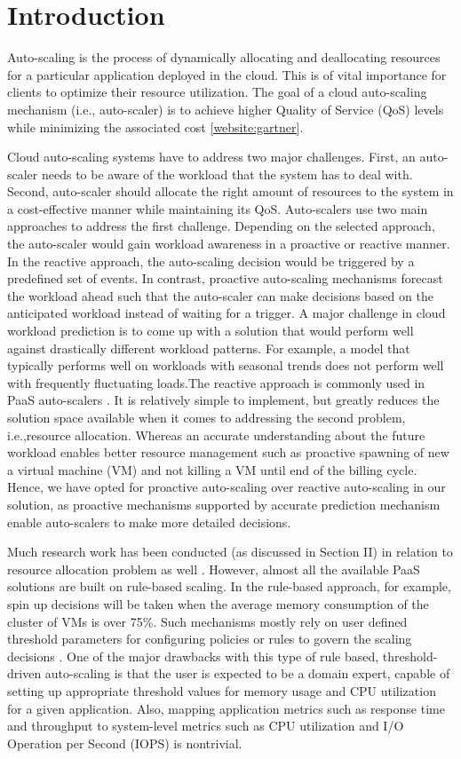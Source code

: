 \section{Introduction}
Auto-scaling is the process of dynamically allocating and deallocating resources for a particular application deployed in the cloud. This is of vital importance for clients to optimize their resource utilization. The goal of a cloud auto-scaling mechanism (i.e., auto-scaler) is to achieve higher Quality of Service (QoS) levels while minimizing the associated cost \ref{website:gartner}.

Cloud auto-scaling systems have to address two major challenges. First, an auto-scaler needs to be aware of the workload that the system has to deal with. Second, auto-scaler should allocate the right amount of resources to the system in a cost-effective manner while maintaining its QoS. Auto-scalers use two main approaches to address the first challenge. Depending on the selected approach, the auto-scaler would gain workload awareness in a proactive or reactive manner. In the reactive approach, the auto-scaling decision would be triggered by a predefined set of events. In contrast, proactive auto-scaling mechanisms forecast the workload ahead such that the auto-scaler can make decisions based on the anticipated workload instead of waiting for a trigger. A major challenge in cloud workload prediction is to come up with a solution that would perform well against drastically different workload patterns. For example, a model that typically performs well on workloads with seasonal trends does not perform well with frequently fluctuating loads.The reactive approach is commonly used in PaaS auto-scalers \cite{website:openshift} \cite{website:bluemix}. It is relatively simple to implement, but greatly reduces the solution space available when it comes to addressing the second problem, i.e.,resource allocation. Whereas  an accurate understanding about the future workload enables better resource management such as proactive spawning of new a virtual machine (VM) and not killing a VM until end of the billing cycle. Hence, we have opted for proactive auto-scaling over reactive auto-scaling in our solution, as proactive mechanisms supported by accurate prediction mechanism enable auto-scalers to make more detailed decisions.

Much research work has been conducted (as discussed in Section II) in relation to resource allocation problem as well \cite{Khatua_2010} \cite{Iqbal_2011}. However, almost all the available PaaS solutions are built on rule-based scaling. In the rule-based approach, for example, spin up decisions will be taken when the average memory consumption of the cluster of VMs is over 75\%. Such mechanisms mostly rely on user defined threshold parameters for configuring policies or rules to govern the scaling decisions \cite{modeldriven}. One of the major drawbacks with this type of rule based, threshold-driven auto-scaling is that the user is expected to be a domain expert, capable of setting up appropriate threshold values for memory usage and CPU utilization for a given application. Also, mapping application metrics such as response time and throughput to system-level metrics such as CPU utilization and I/O Operation per Second (IOPS) is nontrivial.

